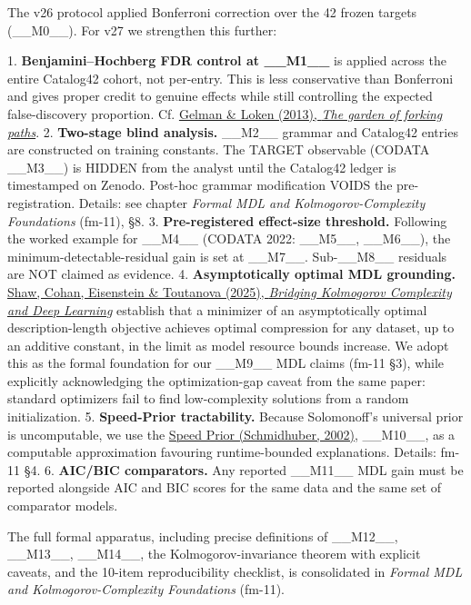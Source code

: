 The v26 protocol applied Bonferroni correction over the 42 frozen targets (\_\_M0\_\_). For v27 we strengthen this further:

1. \textbf{Benjamini--Hochberg FDR control at \_\_M1\_\_} is applied across the entire Catalog42 cohort, not per-entry. This is less conservative than Bonferroni and gives proper credit to genuine effects while still controlling the expected false-discovery proportion. Cf. \href{https://sites.stat.columbia.edu/gelman/research/unpublished/forking.pdf}{Gelman \& Loken (2013), \textit{The garden of forking paths}}.
2. \textbf{Two-stage blind analysis.} \_\_M2\_\_ grammar and Catalog42 entries are constructed on training constants. The TARGET observable (CODATA \_\_M3\_\_) is HIDDEN from the analyst until the Catalog42 ledger is timestamped on Zenodo. Post-hoc grammar modification VOIDS the pre-registration. Details: see chapter \textit{Formal MDL and Kolmogorov-Complexity Foundations} (fm-11), §8.
3. \textbf{Pre-registered effect-size threshold.} Following the worked example for \_\_M4\_\_ (CODATA 2022: \_\_M5\_\_, \_\_M6\_\_), the minimum-detectable-residual gain is set at \_\_M7\_\_. Sub-\_\_M8\_\_ residuals are NOT claimed as evidence.
4. \textbf{Asymptotically optimal MDL grounding.} \href{https://arxiv.org/abs/2509.22445}{Shaw, Cohan, Eisenstein \& Toutanova (2025), \textit{Bridging Kolmogorov Complexity and Deep Learning}} establish that a minimizer of an asymptotically optimal description-length objective achieves optimal compression for any dataset, up to an additive constant, in the limit as model resource bounds increase. We adopt this as the formal foundation for our \_\_M9\_\_ MDL claims (fm-11 §3), while explicitly acknowledging the optimization-gap caveat from the same paper: standard optimizers fail to find low-complexity solutions from a random initialization.
5. \textbf{Speed-Prior tractability.} Because Solomonoff's universal prior is uncomputable, we use the \href{https://doi.org/10.1007/3-540-45435-7\_15}{Speed Prior (Schmidhuber, 2002)}, \_\_M10\_\_, as a computable approximation favouring runtime-bounded explanations. Details: fm-11 §4.
6. \textbf{AIC/BIC comparators.} Any reported \_\_M11\_\_ MDL gain must be reported alongside AIC and BIC scores for the same data and the same set of comparator models.

The full formal apparatus, including precise definitions of \_\_M12\_\_, \_\_M13\_\_, \_\_M14\_\_, the Kolmogorov-invariance theorem with explicit caveats, and the 10-item reproducibility checklist, is consolidated in \textit{Formal MDL and Kolmogorov-Complexity Foundations} (fm-11).

